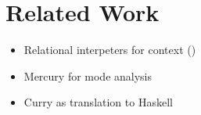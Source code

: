 \section{Related Work}

\begin{itemize}
  \item Relational interpeters for context (\cite{lozov2019relational})
  \item Mercury for mode analysis
  \item Curry as translation to Haskell
\end{itemize}


